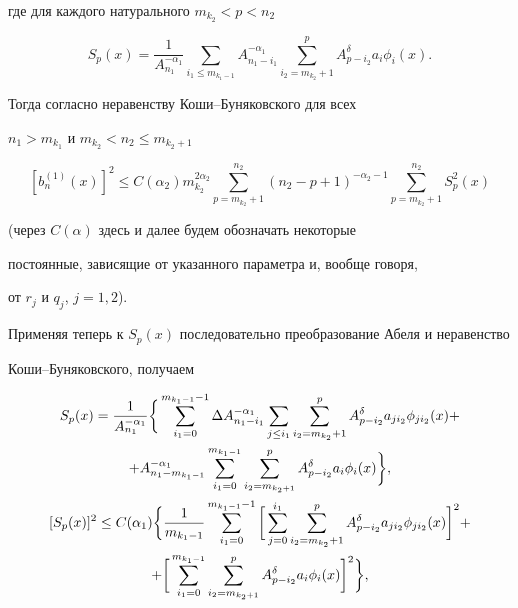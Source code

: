 где для каждого натурального $m_{k_2}<p<n_2$


$$


S_p(x)=\frac{1}{A_{n_1}^{-\alpha_1}} \sum_{i_1\le


m_{k_1-1}}A_{n_1-i_1}^{-\alpha_1}\sum_{i_2=m_{k_2}+1}^pA_{p-i_2}^\delta


a_i \phi _i(x).


$$


Тогда согласно неравенству Коши--Буняковского для всех


$n_1>m_{k_1}$ и $m_{k_2}<n_2\le m_{k_2+1}$


\begin{equation}


\label{F20}


[b_n^{(1)}(x) ]^2 \le C(\alpha_2)m_{k_2}^{2\alpha_2}


\sum_{p=m_{k_2}+1}^{n_2}(n_2-p+1)^{-\alpha_2 -1}


\sum_{p=m_{k_2}+1}^{n_2}S_p^2(x)


\end{equation}


(через $C(\alpha )$ здесь и далее будем обозначать некоторые


постоянные, зависящие от указанного параметра и, вообще говоря,


от $r_j$ и $q_j$, $j=1,2$).





Применяя теперь к $S_p(x)$ последовательно преобразование Абеля и неравенство


Коши--Бу\-ня\-ков\-ско\-го, получаем


\begin{gather}


S_p(x)=\frac{1}{A_{n_1}^{-\alpha_1}} \bigg\{ \sum_{i_1=0}^{m_{k_1-1}-1}\Delta


A_{n_1-i_1}^{-\alpha_1}\sum_{j\le i_1}\sum_{i_2=m_{k_2}+1}^p


A_{p-i_2}^\delta a_{ji_2}\phi_{ji_2}(x)+\notag \\


%


+A_{n_1-m_{k_1-1}}^{-\alpha_1}\sum_{i_1=0}^{m_{k_1-1}}\sum_{i_2=m_{k_2+1}}^p


A_{p-i_2}^\delta a_i\phi_i(x) \bigg\},\notag \\


%


[S_p(x)]^2\le C(\alpha_1) \bigg\{ \frac{1}{m_{k_1-1}}


\sum_{i_1=0}^{m_{k_1-1}-1} \bigg[ \sum_{j=0}^{i_1}


\sum_{i_2=m_{k_2}+1}^pA_{p-i_2}^\delta a_{ji_2}\phi_{ji_2}(x)\bigg]^2+\notag\\


%


\label{F21}


+ \bigg[ \sum_{i_1=0}^{m_{k_1-1}}\sum_{i_2=m_{k_2+1}}^p A_{p-i_2}^\delta


a_i \phi_i (x) \bigg]^2 \bigg\},


\end{gather}


